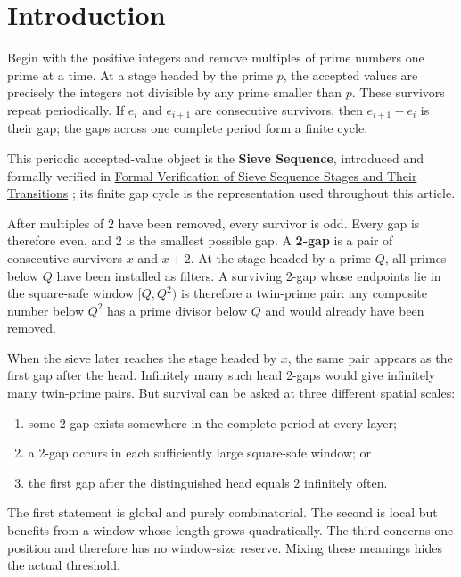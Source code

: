 \section{Introduction}
Begin with the positive integers and remove multiples of prime numbers one prime at a time. At a stage headed by the prime $p$, the accepted values are precisely the integers not divisible by any prime smaller than $p$. These survivors repeat periodically. If $e_i$ and $e_{i+1}$ are consecutive survivors, then $e_{i+1}-e_i$ is their gap; the gaps across one complete period form a finite cycle.

This periodic accepted-value object is the \textbf{Sieve Sequence}, introduced and formally verified in \href{https://doi.org/10.5281/zenodo.22955782}{Formal Verification of Sieve Sequence Stages and Their Transitions} \cite{sievesequence2026}; its finite gap cycle is the representation used throughout this article.

After multiples of $2$ have been removed, every survivor is odd. Every gap is therefore even, and $2$ is the smallest possible gap. A \textbf{2-gap} is a pair of consecutive survivors $x$ and $x+2$. At the stage headed by a prime $Q$, all primes below $Q$ have been installed as filters. A surviving 2-gap whose endpoints lie in the square-safe window $[Q,Q^2)$ is therefore a twin-prime pair: any composite number below $Q^2$ has a prime divisor below $Q$ and would already have been removed.

When the sieve later reaches the stage headed by $x$, the same pair appears as the first gap after the head. Infinitely many such head 2-gaps would give infinitely many twin-prime pairs. But survival can be asked at three different spatial scales:

\begin{enumerate}
\item some 2-gap exists somewhere in the complete period at every layer;
\item a 2-gap occurs in each sufficiently large square-safe window; or
\item the first gap after the distinguished head equals $2$ infinitely often.
\end{enumerate}

The first statement is global and purely combinatorial. The second is local but benefits from a window whose length grows quadratically. The third concerns one position and therefore has no window-size reserve. Mixing these meanings hides the actual threshold.

